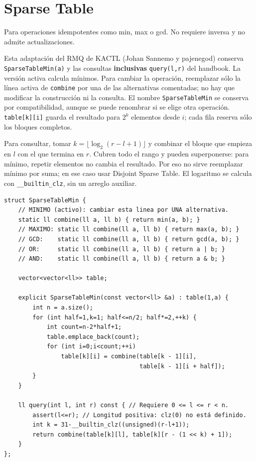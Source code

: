\section{Sparse Table}

Para operaciones idempotentes como min, max o gcd. No requiere inversa y no
admite actualizaciones.

Esta adaptación del RMQ de KACTL (Johan Sannemo y pajenegod) conserva
\texttt{SparseTableMin(a)} y las consultas \textbf{inclusivas} \texttt{query(l,r)}
del handbook. La versión activa calcula mínimos. Para cambiar la operación,
reemplazar sólo la línea activa de \texttt{combine} por una de las alternativas
comentadas; no hay que modificar la construcción ni la consulta. El nombre
\texttt{SparseTableMin} se conserva por compatibilidad, aunque se puede
renombrar si se elige otra operación. \texttt{table[k][i]} guarda el resultado
para $2^k$ elementos desde $i$; cada fila reserva sólo los bloques completos.

Para consultar, tomar $k=\lfloor\log_2(r-l+1)\rfloor$ y combinar el bloque que
empieza en $l$ con el que termina en $r$. Cubren todo el rango y pueden
superponerse: para mínimo, repetir elementos no cambia el resultado. Por eso
no sirve reemplazar mínimo por suma; en ese caso usar Disjoint Sparse Table.
El logaritmo se calcula con \texttt{\_\_builtin\_clz}, sin un arreglo auxiliar.


\begin{lstlisting}[style=cpp]
struct SparseTableMin {
    // MINIMO (activo): cambiar esta linea por UNA alternativa.
    static ll combine(ll a, ll b) { return min(a, b); }
    // MAXIMO: static ll combine(ll a, ll b) { return max(a, b); }
    // GCD:    static ll combine(ll a, ll b) { return gcd(a, b); }
    // OR:     static ll combine(ll a, ll b) { return a | b; }
    // AND:    static ll combine(ll a, ll b) { return a & b; }

    vector<vector<ll>> table;

    explicit SparseTableMin(const vector<ll> &a) : table(1,a) {
        int n = a.size();
        for (int half=1,k=1; half<=n/2; half*=2,++k) {
            int count=n-2*half+1;
            table.emplace_back(count);
            for (int i=0;i<count;++i)
                table[k][i] = combine(table[k - 1][i],
                                      table[k - 1][i + half]);
        }
    }

    ll query(int l, int r) const { // Requiere 0 <= l <= r < n.
        assert(l<=r); // Longitud positiva: clz(0) no está definido.
        int k = 31-__builtin_clz((unsigned)(r-l+1));
        return combine(table[k][l], table[k][r - (1 << k) + 1]);
    }
};
\end{lstlisting}

